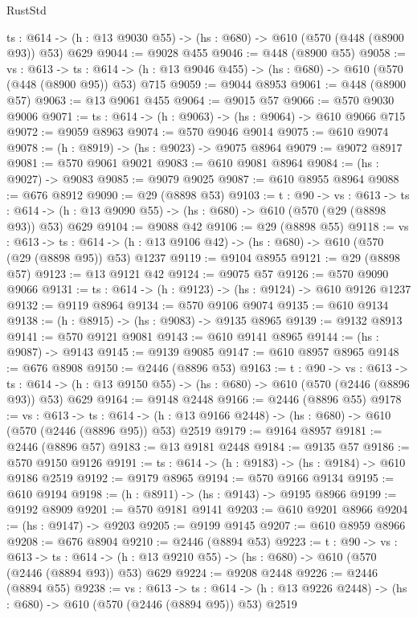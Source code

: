 \begin{lexlean}{RustStd}
\begin{coremodule}
  {ts : @614} -> (h : @13 @9030 @55) -> (hs : @680) -> @610 (@570 (@448 (@8900 @93)) @53) @629
@9044 := @9028 @455
@9046 := @448 (@8900 @55)
@9058 := {vs : @613} ->
  {ts : @614} -> (h : @13 @9046 @455) -> (hs : @680) -> @610 (@570 (@448 (@8900 @95)) @53) @715
@9059 := @9044 @8953
@9061 := @448 (@8900 @57)
@9063 := @13 @9061 @455
@9064 := @9015 @57
@9066 := @570 @9030 @9006
@9071 := {ts : @614} -> (h : @9063) -> (hs : @9064) -> @610 @9066 @715
@9072 := @9059 @8963
@9074 := @570 @9046 @9014
@9075 := @610 @9074
@9078 := (h : @8919) -> (hs : @9023) -> @9075 @8964
@9079 := @9072 @8917
@9081 := @570 @9061 @9021
@9083 := @610 @9081 @8964
@9084 := (hs : @9027) -> @9083
@9085 := @9079 @9025
@9087 := @610 @8955 @8964
@9088 := @676 @8912
@9090 := @29 (@8898 @53)
@9103 := {t : @90} ->
  {vs : @613} ->
  {ts : @614} -> (h : @13 @9090 @55) -> (hs : @680) -> @610 (@570 (@29 (@8898 @93)) @53) @629
@9104 := @9088 @42
@9106 := @29 (@8898 @55)
@9118 := {vs : @613} ->
  {ts : @614} -> (h : @13 @9106 @42) -> (hs : @680) -> @610 (@570 (@29 (@8898 @95)) @53) @1237
@9119 := @9104 @8955
@9121 := @29 (@8898 @57)
@9123 := @13 @9121 @42
@9124 := @9075 @57
@9126 := @570 @9090 @9066
@9131 := {ts : @614} -> (h : @9123) -> (hs : @9124) -> @610 @9126 @1237
@9132 := @9119 @8964
@9134 := @570 @9106 @9074
@9135 := @610 @9134
@9138 := (h : @8915) -> (hs : @9083) -> @9135 @8965
@9139 := @9132 @8913
@9141 := @570 @9121 @9081
@9143 := @610 @9141 @8965
@9144 := (hs : @9087) -> @9143
@9145 := @9139 @9085
@9147 := @610 @8957 @8965
@9148 := @676 @8908
@9150 := @2446 (@8896 @53)
@9163 := {t : @90} ->
  {vs : @613} ->
  {ts : @614} -> (h : @13 @9150 @55) -> (hs : @680) -> @610 (@570 (@2446 (@8896 @93)) @53) @629
@9164 := @9148 @2448
@9166 := @2446 (@8896 @55)
@9178 := {vs : @613} ->
  {ts : @614} -> (h : @13 @9166 @2448) -> (hs : @680) -> @610 (@570 (@2446 (@8896 @95)) @53) @2519
@9179 := @9164 @8957
@9181 := @2446 (@8896 @57)
@9183 := @13 @9181 @2448
@9184 := @9135 @57
@9186 := @570 @9150 @9126
@9191 := {ts : @614} -> (h : @9183) -> (hs : @9184) -> @610 @9186 @2519
@9192 := @9179 @8965
@9194 := @570 @9166 @9134
@9195 := @610 @9194
@9198 := (h : @8911) -> (hs : @9143) -> @9195 @8966
@9199 := @9192 @8909
@9201 := @570 @9181 @9141
@9203 := @610 @9201 @8966
@9204 := (hs : @9147) -> @9203
@9205 := @9199 @9145
@9207 := @610 @8959 @8966
@9208 := @676 @8904
@9210 := @2446 (@8894 @53)
@9223 := {t : @90} ->
  {vs : @613} ->
  {ts : @614} -> (h : @13 @9210 @55) -> (hs : @680) -> @610 (@570 (@2446 (@8894 @93)) @53) @629
@9224 := @9208 @2448
@9226 := @2446 (@8894 @55)
@9238 := {vs : @613} ->
  {ts : @614} -> (h : @13 @9226 @2448) -> (hs : @680) -> @610 (@570 (@2446 (@8894 @95)) @53) @2519

\end{coremodule}
\end{lexlean}
